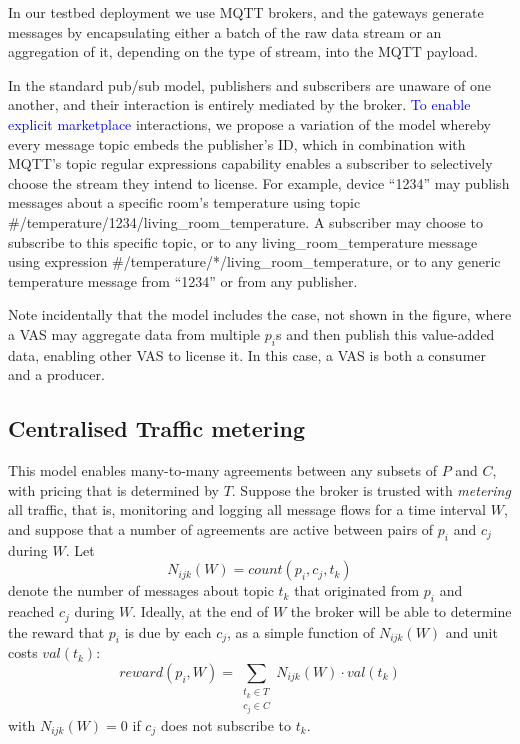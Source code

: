 \documentclass[chi_draft]{sigchi}
\begin{document}
In our testbed deployment we use MQTT brokers, and the gateways generate messages by encapsulating either a batch of the raw data stream or an aggregation of it, depending on the type of stream, into the MQTT payload.


In the standard pub/sub model, publishers and subscribers are unaware of one another, and their interaction is entirely mediated by the broker. 
\textcolor{blue}{To enable explicit marketplace} interactions, we propose a variation of the model whereby every message topic embeds the publisher's ID, which in combination with MQTT's topic regular expressions capability enables a subscriber to selectively choose the stream they intend to license.
For example, device ``1234'' may publish messages about a specific room's temperature using topic  \#/temperature/1234/living\_room\_temperature. 
A subscriber may choose to subscribe to this specific topic, or to any  living\_room\_temperature message using expression \#/temperature/*/living\_room\_temperature, or to any generic temperature message from ``1234'' or from any publisher.

Note incidentally that the model includes the case, not shown in the figure, where a VAS may aggregate data from multiple $ p_i $s and then publish this value-added data, enabling other VAS to license it. 
In this case, a VAS is both a consumer and a producer.

\subsection{Centralised Traffic metering}

This model enables many-to-many agreements between any subsets of $P$ and $C$, with pricing that is determined by $T$.
Suppose the broker is trusted with \textit{metering} all traffic, that is, monitoring and logging all message flows for a time interval $W$, and suppose that a number of agreements are active between pairs of $p_i$ and $c_j$ during $W$.
Let 
\[N_{ijk}(W) = \mathit{count}(p_i, c_j, t_k)\]
denote the number of messages about topic $t_k$ that originated from $p_i$ and reached $c_j$ during $W$.
Ideally, at the end of $W$ the broker will be able to determine the reward that $p_i$ is due by each $c_j$, as a simple function of $N_{ijk}(W)$ and unit costs $\mathit{val}(t_k)$:
\begin{equation}
\mathit{reward}(p_i, W) = \sum_{\substack{t_k \in T \\ c_j \in C}} N_{ijk}(W) \cdot \mathit{val}(t_k)
\label{eq:reward}
\end{equation}
with $N_{ijk}(W) = 0$ if $c_j$ does not subscribe to $t_k$.
\end{document}
